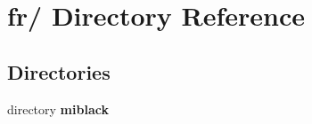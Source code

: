 \section{fr/ Directory Reference}
\label{dir_842f391c3395acb31461cd3ab3c2f8a4}
\subsection*{Directories}
\begin{DoxyCompactItemize}
\item 
directory {\bf miblack}
\end{DoxyCompactItemize}
